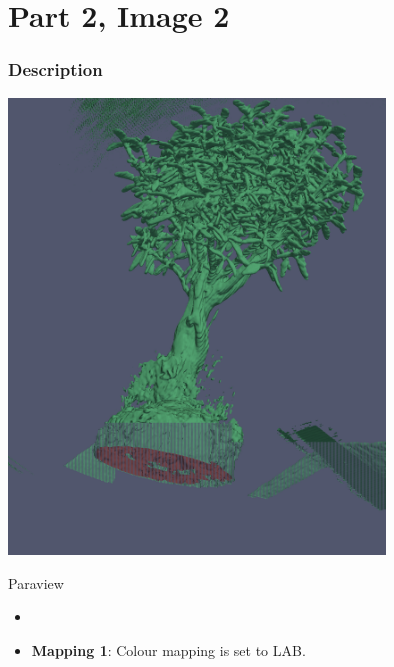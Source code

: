 \hypertarget{part-2-image-2}{%
	\section{Part 2, Image 2}\label{part-1-design-3}}

\centering


\hypertarget{description}{%
	\subsubsection{Description}\label{description}}

\begin{description}
	\item[Image:]
	\item\includegraphics[width=10cm]{Tree2.png}
	\item[Tool:]
	\hfill \break
	Paraview
	\item[Visual Mappings:]
	\begin{itemize}
		\tightlist
		\item[ ]
	\end{itemize}
	\begin{itemize}
		\tightlist
		\item
		\textbf{Mapping 1}:
		\hfill \break 
		Colour mapping is set to LAB.
	\end{itemize}
	

\end{description}
